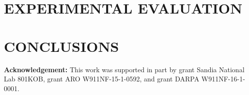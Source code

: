 \documentclass[letterpaper, 10 pt, conference]{ieeeconf}  %
\begin{document}
\section{EXPERIMENTAL EVALUATION}\label{sec:experiments}



\section{CONCLUSIONS}


\bigskip

{\bf Acknowledgement:} This work was supported in part by grant Sandia National Lab 801KOB, grant ARO W911NF-15-1-0592,  and grant DARPA W911NF-16-1-0001.




	



\end{document}

